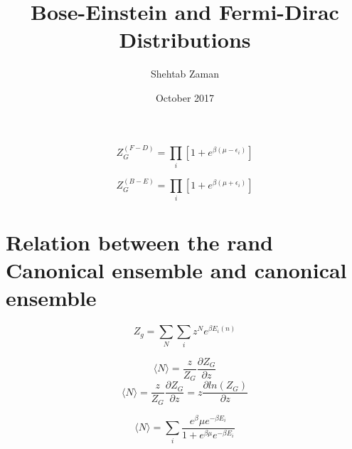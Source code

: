 \documentclass{article}
\title{Bose-Einstein and Fermi-Dirac Distributions}
\author{Shehtab Zaman }
\date{October 2017}
\begin{document}
$$ Z_G^{(F-D)} = \prod_{i} \left[{1+e^{\beta(\mu - \epsilon_i)}}\right]$$

$$ Z_G^{(B-E)} = \prod_{i} \left[{1+e^{\beta(\mu + \epsilon_i)}} \right]$$

\section{Relation between the rand Canonical ensemble and canonical ensemble}

$$ Z_g = \sum_{N} \sum_{i} z^N e^{\beta E_i (n)}$$

$$ \langle N \rangle = \frac{z}{Z_G} \frac{\partial Z_G}{\partial z}$$
$$ \langle N \rangle = \frac{z}{Z_G} \frac{\partial Z_G}{\partial z} = z \frac{\partial ln(Z_G)}{\partial z}$$


$$ \langle N \rangle = \sum_{i} \frac{e^\beta\mu e^{-\beta E_i}}{1 + e^{\beta\mu}e^{-\beta E_i}}$$
\end{document}
